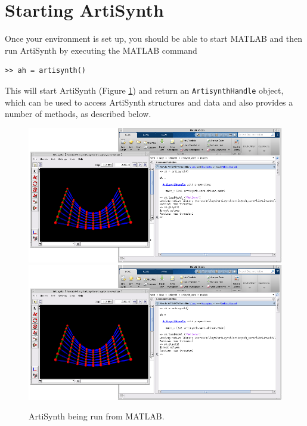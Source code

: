 \documentclass{article}
\begin{document}
\section{Starting ArtiSynth} 

Once your environment is set up, you should be able to start MATLAB
and then run ArtiSynth by executing the MATLAB command
%
\begin{lstlisting}[]
  >> ah = artisynth()
\end{lstlisting}
%
This will start ArtiSynth (Figure \ref{artisynthMatlab:fig}) and
return an {\tt ArtisynthHandle} object, which can be used to access
ArtiSynth structures and data and also provides a number of methods,
as described below.

\begin{figure}[t]
\begin{center}
\iflatexml
 \includegraphics[]{images/artisynthMatlab}
\else
 \includegraphics[width=6in]{images/artisynthMatlab}
\fi
\end{center}
\caption{ArtiSynth being run from MATLAB.}
\label{artisynthMatlab:fig}
\end{figure}
\end{document}
